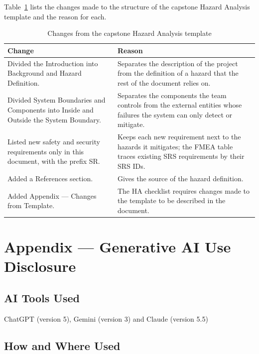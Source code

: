 \documentclass{article}
\begin{document}
Table~\ref{TblTemplateChanges} lists the changes made to the structure of the
capstone Hazard Analysis template and the reason for each.

\begin{table}[h]
\centering
\caption{Changes from the capstone Hazard Analysis template}
\label{TblTemplateChanges}
\begin{tabularx}{\textwidth}{p{5cm}X}
\toprule
\textbf{Change} & \textbf{Reason} \\
\midrule
Divided the Introduction into Background and Hazard Definition. & Separates the
description of the project from the definition of a hazard that the rest of the
document relies on. \\
Divided System Boundaries and Components into Inside and Outside the System
Boundary. & Separates the components the team controls from the external
entities whose failures the system can only detect or mitigate. \\
Listed new safety and security requirements only in this document, with the
prefix SR. & Keeps each new requirement next to the hazards it mitigates; the
FMEA table traces existing SRS requirements by their SRS IDs. \\
Added a References section. & Gives the source of the hazard definition. \\
Added Appendix --- Changes from Template. & The HA checklist requires changes
made to the template to be described in the document. \\
\bottomrule
\end{tabularx}
\end{table}

\newpage{}

\section{Appendix --- Generative AI Use Disclosure}





\subsection{AI Tools Used}

ChatGPT (version 5), Gemini (version 3) and Claude (version 5.5)

\subsection{How and Where Used}
\end{document}
